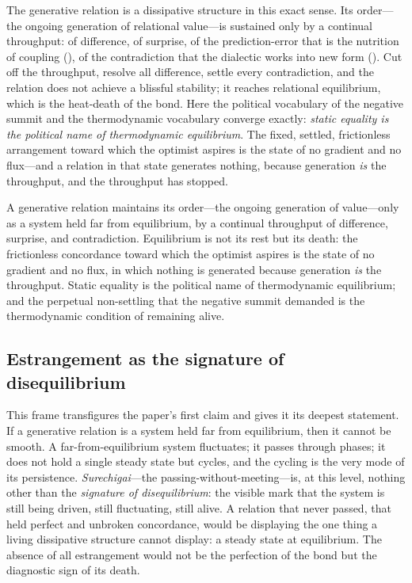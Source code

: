 The generative relation is a dissipative structure in this exact sense. Its order---the ongoing generation of relational value---is sustained only by a continual throughput: of difference, of surprise, of the prediction-error that is the nutrition of coupling (), of the contradiction that the dialectic works into new form (). Cut off the throughput, resolve all difference, settle every contradiction, and the relation does not achieve a blissful stability; it reaches relational equilibrium, which is the heat-death of the bond. Here the political vocabulary of the negative summit and the thermodynamic vocabulary converge exactly: \emph{static equality is the political name of thermodynamic equilibrium}. The fixed, settled, frictionless arrangement toward which the optimist aspires is the state of no gradient and no flux---and a relation in that state generates nothing, because generation \emph{is} the throughput, and the throughput has stopped.

\begin{claim}
A generative relation maintains its order---the ongoing generation of value---only as a system held far from equilibrium, by a continual throughput of difference, surprise, and contradiction. Equilibrium is not its rest but its death: the frictionless concordance toward which the optimist aspires is the state of no gradient and no flux, in which nothing is generated because generation \emph{is} the throughput. Static equality is the political name of thermodynamic equilibrium; and the perpetual non-settling that the negative summit demanded is the thermodynamic condition of remaining alive.
\end{claim}

\subsection{Estrangement as the signature of disequilibrium}
\label{p17:sub:dissipation-signature}

This frame transfigures the paper's first claim and gives it its deepest statement. If a generative relation is a system held far from equilibrium, then it cannot be smooth. A far-from-equilibrium system fluctuates; it passes through phases; it does not hold a single steady state but cycles, and the cycling is the very mode of its persistence. \emph{Surechigai}---the passing-without-meeting---is, at this level, nothing other than the \emph{signature of disequilibrium}: the visible mark that the system is still being driven, still fluctuating, still alive. A relation that never passed, that held perfect and unbroken concordance, would be displaying the one thing a living dissipative structure cannot display: a steady state at equilibrium. The absence of all estrangement would not be the perfection of the bond but the diagnostic sign of its death.

